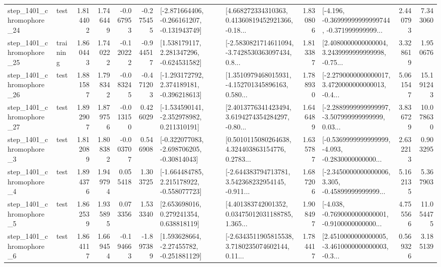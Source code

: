 \begin{tabular}{llrrrrllrlrr}
 step\_1401\_chromophore\_24 &      test &      1.814402 &    1.746449 &     -0.067953 & -0.275455 &  [-2.871664406, -0.266161207, -0.131943749] &  [4.668272334310363, 0.41360819452921366, -0.18... &       1.830806 &  [-4.196, -0.36999999999999744, -0.371999999999... &            2.440793 &          7.343060 \\
 step\_1401\_chromophore\_25 &  training &      1.860443 &    1.740222 &     -0.120222 & -0.944517 &    [1.538179117, 2.281347296, -0.624531582] &  [-2.5830821714611094, -3.7428530363097434, 0.8... &       1.813387 &  [2.4080000000000004, 3.2439999999999998, -0.75... &            3.328619 &          1.950676 \\
 step\_1401\_chromophore\_26 &      test &      1.881587 &    1.798342 &     -0.083245 & -0.471203 &   [-1.293172792, 2.374189181, -0.396218613] &  [1.3510979468015931, -4.152701345896163, 0.580... &       1.788930 &  [-2.2790000000000017, 3.4720000000000013, -0.4... &            5.061547 &         15.191243 \\
 step\_1401\_chromophore\_27 &      test &      1.892907 &    1.879756 &     -0.013150 &  0.426029 &   [-1.534590141, -2.352978982, 0.211310191] &  [2.4013776341423494, 3.6194274354284297, -0.80... &       1.646489 &  [-2.2889999999999997, -3.507999999999999, 0.03... &            3.836729 &         10.078630 \\
  step\_1401\_chromophore\_3 &      test &      1.812089 &    1.808382 &     -0.003707 &  0.546908 &   [-0.322077083, -2.698706205, -0.30814043] &  [0.5010115080264638, 4.324403863154776, 0.2783... &       1.635787 &  [-0.5369999999999999, -4.093, -0.2830000000000... &            2.632213 &          0.903295 \\
  step\_1401\_chromophore\_4 &      test &      1.894376 &    1.949794 &      0.055418 &  1.303725 &   [-1.664484785, 2.215178922, -0.558077723] &  [-2.644383794713781, 3.542368232954145, -0.911... &       1.687206 &  [-2.3450000000000006, 3.305, -0.45899999999999... &            5.162135 &          5.367903 \\
  step\_1401\_chromophore\_5 &      test &      1.862539 &    1.935895 &      0.073356 &  1.533340 &     [2.653698016, 0.279241354, 0.638818119] &  [4.401383742001352, 0.03475012031188785, 1.365... &       1.908497 &  [-4.038, -0.7690000000000001, -0.9100000000000... &            4.755566 &         11.054475 \\
  step\_1401\_chromophore\_6 &      test &      1.864117 &    1.669454 &     -0.194663 & -1.897389 &    [1.593628664, -2.27455782, -0.251881129] &  [-2.6343511905815538, 3.7180235074602144, 0.11... &       1.784417 &  [2.4510000000000005, -3.4610000000000003, -0.3... &            0.569326 &          3.185139 \\

\end{tabular}
